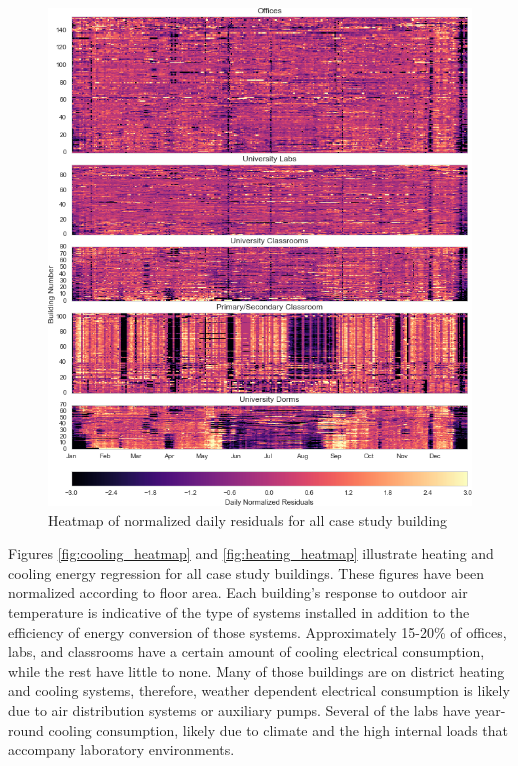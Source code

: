 \begin{figure}[ht!]
\begin{center}
\includegraphics[width=1\columnwidth]{figures/loadshape_heatmap/loadshape_heatmap}
\caption{Heatmap of normalized daily residuals for all case study building
\label{fig:loadshape_all}%
}
\end{center}
\end{figure}

Figures \ref{fig:cooling_heatmap} and \ref{fig:heating_heatmap} illustrate heating and cooling energy regression for all case study buildings. These figures have been normalized according to floor area. Each building's response to outdoor air temperature is indicative of the type of systems installed in addition to the efficiency of energy conversion of those systems. Approximately 15-20\% of offices, labs, and classrooms have a certain amount of cooling electrical consumption, while the rest have little to none. Many of those buildings are on district heating and cooling systems, therefore, weather dependent electrical consumption is likely due to air distribution systems or auxiliary pumps. Several of the labs have year-round cooling consumption, likely due to climate and the high internal loads that accompany laboratory environments.

